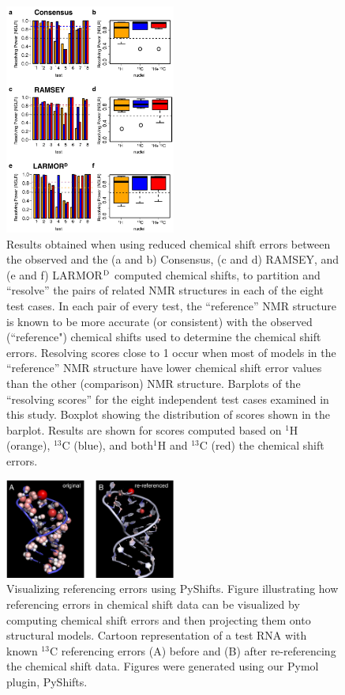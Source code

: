 \documentclass[fleqn,10pt]{wlscirep_atf}
\begin{document}
\begin{figure}[h]
\begin{center}
\includegraphics[width=0.5\textwidth]{figure_supplement_nslr}
\end{center}
\caption{ Results obtained when using reduced chemical shift errors between the observed and the (a and b) Consensus, (c and d) RAMSEY, and (e and f) LARMOR$^{\rm D}$ computed chemical shifts, to partition and ``resolve'' the pairs of related NMR structures in each of the eight test cases. In each pair of every test, the ``reference'' NMR structure is known to be more accurate (or consistent) with the observed (``reference") chemical shifts used to determine the chemical shift errors. Resolving scores close to 1 occur when most of models in the ``reference'' NMR structure have lower chemical shift error values than the other (comparison) NMR structure. Barplots of the ``resolving scores'' for the eight independent test cases examined in this study. Boxplot showing the distribution of scores shown in the barplot. Results are shown for scores computed based on $^{1}$H (orange), $^{13}$C (blue), and both$^{1}$H and $^{13}$C (red) the chemical shift errors.}
\label{fig:supporting_nslr}
\end{figure}
\clearpage

\begin{figure}[h]
\begin{center}
\includegraphics[width=0.5\textwidth]{figure_supplement_referencing}
\end{center}
\caption{ Visualizing referencing errors using PyShifts. Figure illustrating how referencing errors in chemical shift data can be visualized by computing chemical shift errors and then projecting them onto structural models. Cartoon representation of a test RNA with known $^{13}$C referencing errors (A) before and (B) after re-referencing the chemical shift data. Figures were generated using our Pymol plugin, PyShifts.}
\label{fig:supporting_nslr}
\end{figure}
\clearpage
\end{document}
